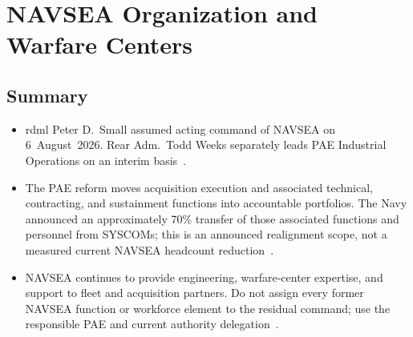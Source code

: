\documentclass[../main.tex]{subfiles}
\begin{document}

\section{NAVSEA Organization and Warfare Centers}


\subsection{Summary}
\begin{itemize}
  \item \ac{rdml} Peter D.\ Small assumed acting command of NAVSEA on 6~August~2026. Rear Adm.\ Todd Weeks separately leads PAE Industrial Operations on an interim basis~\autocite{DVIDS-Small-NAVSEA-Aug2026,DVIDS-Weeks-PAEIO-Aug2026}.
  \item The PAE reform moves acquisition execution and associated technical, contracting, and sustainment functions into accountable portfolios. The Navy announced an approximately 70\% transfer of those associated functions and personnel from SYSCOMs; this is an announced realignment scope, not a measured current NAVSEA headcount reduction~\autocite{DON-PAE-Expansion-May2026}.
  \item NAVSEA continues to provide engineering, warfare-center expertise, and support to fleet and acquisition partners. Do not assign every former NAVSEA function or workforce element to the residual command; use the responsible PAE and current authority delegation~\autocite{DVIDS-Small-NAVSEA-Aug2026,edo-2-1-2-navsea-organization-2025}.
\end{itemize}
\end{document}
